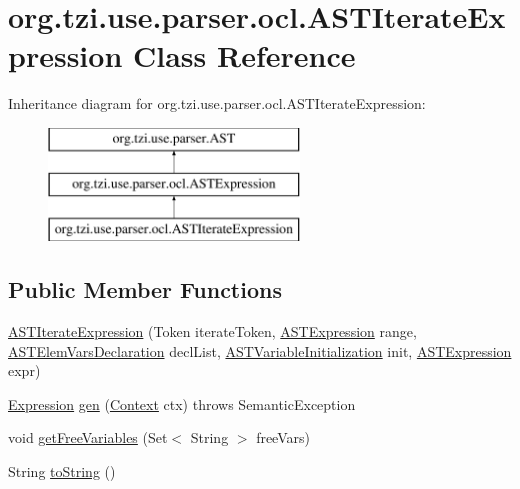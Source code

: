 \hypertarget{classorg_1_1tzi_1_1use_1_1parser_1_1ocl_1_1_a_s_t_iterate_expression}{\section{org.\-tzi.\-use.\-parser.\-ocl.\-A\-S\-T\-Iterate\-Expression Class Reference}
\label{classorg_1_1tzi_1_1use_1_1parser_1_1ocl_1_1_a_s_t_iterate_expression}
}
Inheritance diagram for org.\-tzi.\-use.\-parser.\-ocl.\-A\-S\-T\-Iterate\-Expression\-:\begin{figure}[H]
\begin{center}
\leavevmode
\includegraphics[height=3.000000cm]{classorg_1_1tzi_1_1use_1_1parser_1_1ocl_1_1_a_s_t_iterate_expression}
\end{center}
\end{figure}
\subsection*{Public Member Functions}
\begin{DoxyCompactItemize}
\item 
\hyperlink{classorg_1_1tzi_1_1use_1_1parser_1_1ocl_1_1_a_s_t_iterate_expression_a1fbb220b054657a8b26503b6a531b0dc}{A\-S\-T\-Iterate\-Expression} (Token iterate\-Token, \hyperlink{classorg_1_1tzi_1_1use_1_1parser_1_1ocl_1_1_a_s_t_expression}{A\-S\-T\-Expression} range, \hyperlink{classorg_1_1tzi_1_1use_1_1parser_1_1ocl_1_1_a_s_t_elem_vars_declaration}{A\-S\-T\-Elem\-Vars\-Declaration} decl\-List, \hyperlink{classorg_1_1tzi_1_1use_1_1parser_1_1ocl_1_1_a_s_t_variable_initialization}{A\-S\-T\-Variable\-Initialization} init, \hyperlink{classorg_1_1tzi_1_1use_1_1parser_1_1ocl_1_1_a_s_t_expression}{A\-S\-T\-Expression} expr)
\item 
\hyperlink{classorg_1_1tzi_1_1use_1_1uml_1_1ocl_1_1expr_1_1_expression}{Expression} \hyperlink{classorg_1_1tzi_1_1use_1_1parser_1_1ocl_1_1_a_s_t_iterate_expression_a6b44cb1e19e1e326706e2672eef212ef}{gen} (\hyperlink{classorg_1_1tzi_1_1use_1_1parser_1_1_context}{Context} ctx)  throws Semantic\-Exception 
\item 
void \hyperlink{classorg_1_1tzi_1_1use_1_1parser_1_1ocl_1_1_a_s_t_iterate_expression_af39b06c99f819d200d70f97be88438a6}{get\-Free\-Variables} (Set$<$ String $>$ free\-Vars)
\item 
String \hyperlink{classorg_1_1tzi_1_1use_1_1parser_1_1ocl_1_1_a_s_t_iterate_expression_a4e99a0ceabe4eb4b8900e6f2a24be431}{to\-String} ()
\end{DoxyCompactItemize}

